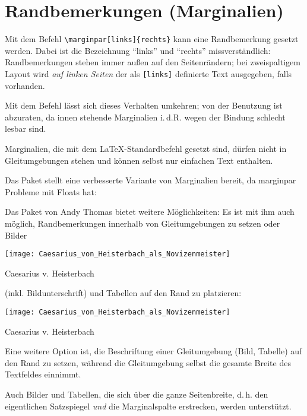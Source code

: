 \section{Randbemerkungen (Marginalien)}

Mit dem Befehl \lstinline/\marginpar[links]{rechts}/ kann eine Randbemerkung gesetzt werden.
Dabei ist die Bezeichnung \enquote{links} und \enquote{rechts} missverständlich: 
Randbemerkungen stehen immer außen auf den Seitenrändern; bei zweispaltigem Layout wird 
\emph{auf linken Seiten} der als \lstinline/[links]/ definierte Text ausgegeben, falls vorhanden.

Mit dem Befehl  lässt sich dieses Verhalten umkehren; 
von der Benutzung ist abzuraten, da innen stehende Marginalien i.\,d.R. wegen der Bindung schlecht
lesbar sind.

Marginalien, die mit dem \LaTeX -Standardbefehl gesetzt sind, dürfen nicht in Gleitumgebungen
stehen und können selbst nur einfachen Text enthalten.


Das Paket  stellt eine verbesserte Variante von Marginalien bereit, 
da marginpar Probleme mit Floats hat:

Das Paket  von Andy Thomas bietet weitere Möglichkeiten: 
Es ist mit ihm auch möglich, Randbemerkungen innerhalb von Gleitumgebungen zu setzen oder
Bilder
\begin{marginfigure}
 \texttt{[image: Caesarius\_von\_Heisterbach\_als\_Novizenmeister]}
 \caption{Caesarius v. Heisterbach}
\end{marginfigure}
(inkl. Bildunterschrift) und Tabellen auf den Rand zu platzieren:

\begin{lfgwcode}{}
 \begin{marginfigure}
 \texttt{[image: Caesarius\_von\_Heisterbach\_als\_Novizenmeister]}
 \caption{Caesarius v. Heisterbach}
\end{marginfigure}
\end{lfgwcode}


Eine weitere Option ist, die Beschriftung einer Gleitumgebung (Bild, Tabelle) auf den Rand zu
setzen, während die Gleitumgebung selbst die gesamte Breite des Textfeldes einnimmt.

Auch Bilder und Tabellen, die sich über die ganze Seitenbreite, d.\,h. den eigentlichen Satzspiegel
\emph{und} die Marginalspalte erstrecken, werden unterstützt.

